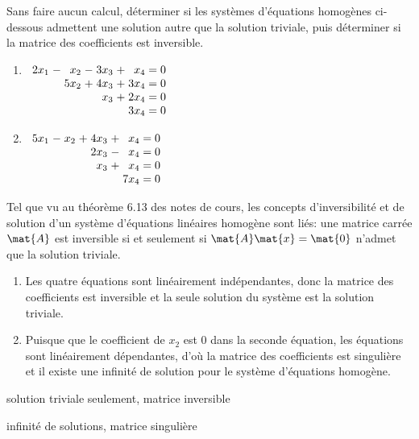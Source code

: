 \begin{exercice}
  Sans faire aucun calcul, déterminer si les systèmes d'équations
  homogènes ci-dessous admettent une solution autre que la solution
  triviale, puis déterminer si la matrice des coefficients est
  inversible.
  \begin{multicols}{2}
    \begin{enumerate}
    \item $%
      \begin{array}[t]{*{3}{r@{\;}c@{\;}}r@{\;=\;}r}
        2x_1 &-&   x_2 &-&  3x_3 &+&   x_4 & 0 \\
             & &  5x_2 &+&  4x_3 &+&  3x_4 & 0 \\
             & &       & &   x_3 &+&  2x_4 & 0 \\
             & &       & &       & &  3x_4 & 0
      \end{array}$
    \item $%
      \begin{array}[t]{*{3}{r@{\;}c@{\;}}r@{\;=\;}r}
        5x_1 &-&   x_2 &+&  4x_3 &+&   x_4 & 0 \\
             & &       & &  2x_3 &-&   x_4 & 0 \\
             & &       & &   x_3 &+&   x_4 & 0 \\
             & &       & &       & &  7x_4 & 0
      \end{array}$
    \end{enumerate}
  \end{multicols}
  \begin{sol}
    Tel que vu au théorème 6.13 des notes de cours, les concepts
    d'inversibilité et de solution d'un système d'équations linéaires
    homogène sont liés: une matrice carrée $\mat{A}$ est inversible si
    et seulement si $\mat{A} \mat{x} = \mat{0}$ n'admet que la
    solution triviale.
    \begin{enumerate}
    \item Les quatre équations sont linéairement indépendantes, donc
      la matrice des coefficients est inversible et la seule solution
      du système est la solution triviale.
    \item Puisque que le coefficient de $x_2$ est 0 dans la seconde
      équation, les équations sont linéairement dépendantes, d'où la
      matrice des coefficients est singulière et il existe une
      infinité de solution pour le système d'équations homogène.
    \end{enumerate}
  \end{sol}
  \begin{rep}
    \begin{inparaenum}
    \item solution triviale seulement, matrice inversible
    \item infinité de solutions, matrice singulière
    \end{inparaenum}
  \end{rep}
\end{exercice}

